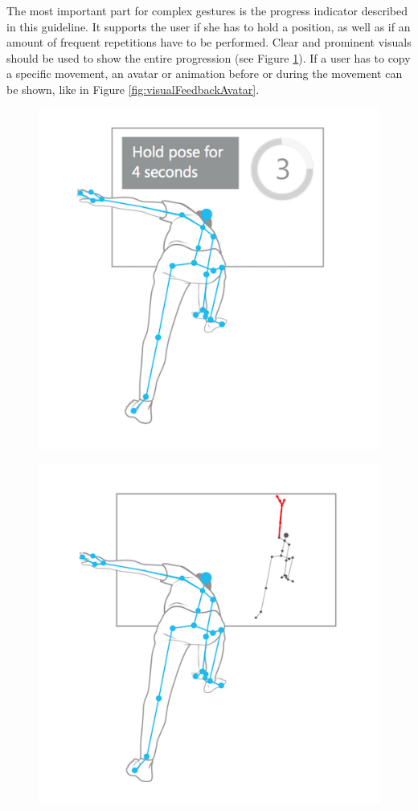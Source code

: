 The most important part for complex gestures is the progress indicator described in this guideline. It supports the user if she has to hold a position, as well as if an amount of frequent repetitions have to be performed. Clear and prominent visuals should be used to show the entire progression (see Figure \ref{fig:visualFeedbackIndicator}). If a user has to copy a specific movement, an avatar or animation before or during the movement can be shown, like in Figure \ref{fig:visualFeedbackAvatar}.
\begin{figure}[htb]
	\centering
	\begin{minipage}[t]{0.49\linewidth}
		\centering
		\includegraphics[width=0.9\linewidth]{Pictures/2_4_visualFeedbackIndicator}
		\label{fig:visualFeedbackIndicator}
	\end{minipage}
	\hfill
	\begin{minipage}[t]{0.49\linewidth}
		\centering
		\includegraphics[width=0.9\linewidth]{Pictures/2_4_visualFeedbackAvatar}

\end{minipage}
\end{figure}
